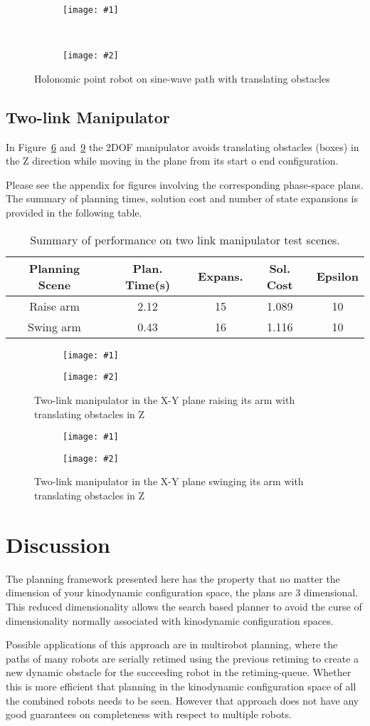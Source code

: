 \documentclass[letterpaper,12pt]{article} %
\newcommand{\ffigdoublevert}[4]{
    \begin{figure}[h!]
    \centering

    \begin{subfigure}[t!]{0.7\linewidth}
    \texttt{[image: \#1]}
    \caption{}
    \label{fig:#4L}
    \end{subfigure}
    ~
    \begin{subfigure}[b!]{0.7\linewidth}
    \texttt{[image: \#2]}
    \caption{}
    \label{fig:#4R}
    \end{subfigure}

    \caption{#3}
    \label{fig:#4}
    \end{figure}
}
\newcommand{\ffigdouble}[4]{
    \begin{figure}[h!]
    \centering

    \begin{subfigure}[t!]{0.48\linewidth}
    \texttt{[image: \#1]}
    \caption{}
    \label{fig:#4L}
    \end{subfigure}
    \begin{subfigure}[b!]{0.48\linewidth}
    \texttt{[image: \#2]}
    \caption{}
    \label{fig:#4R}
    \end{subfigure}

    \caption{#3}
    \label{fig:#4}
    \end{figure}
}
\begin{document}
\ffigdoublevert{pics/trans1}{pics/trans2}{Holonomic point robot on sine-wave path with translating obstacles}{hovertran}

\subsection{Two-link Manipulator}

In Figure~\ref{fig:raisearm} and~\ref{fig:swingarm} the 2DOF manipulator avoids translating obstacles (boxes) in the Z direction while moving in the plane from its start o end configuration.

Please see the appendix for figures involving the corresponding phase-space plans. The summary of planning times, solution cost and number of state expansions is provided in the following table.

\begin{table}[hc]
\begin{center}
\begin{tabular}{c|c|c|c|c}
\hline
Planning Scene & Plan. Time(s) & Expans. & Sol. Cost & Epsilon\\
\hline
Raise arm & 2.12 & 15 & 1.089 & 10\\
Swing arm & 0.43 & 16 & 1.116 & 10 \\
\hline
\end{tabular}
\caption{\small{Summary of performance on two link manipulator test scenes.}}
\label{tab:performance_results}
\end{center}
\end{table}

\ffigdouble{pics/raise1}{pics/raise2}{Two-link manipulator in the X-Y plane raising its arm with translating obstacles in Z}{raisearm}
\ffigdouble{pics/swing1}{pics/swing2}{Two-link manipulator in the X-Y plane swinging its arm with translating obstacles in Z}{swingarm}

\section{Discussion}

The planning framework presented here has the property that no matter the dimension of your kinodynamic configuration space, the plans are 3 dimensional. This reduced dimensionality allows the search based planner to avoid the curse of dimensionality normally associated with kinodynamic configuration spaces.

Possible applications of this approach are in multirobot planning, where the paths of many robots are serially retimed using the previous retiming to create a new dynamic obstacle for the succeeding robot in the retiming-queue. Whether this is more efficient that planning in the kinodynamic configuration space of all the combined robots needs to be seen. However that approach does not have any good guarantees on completeness with respect to multiple robots.
\end{document}
